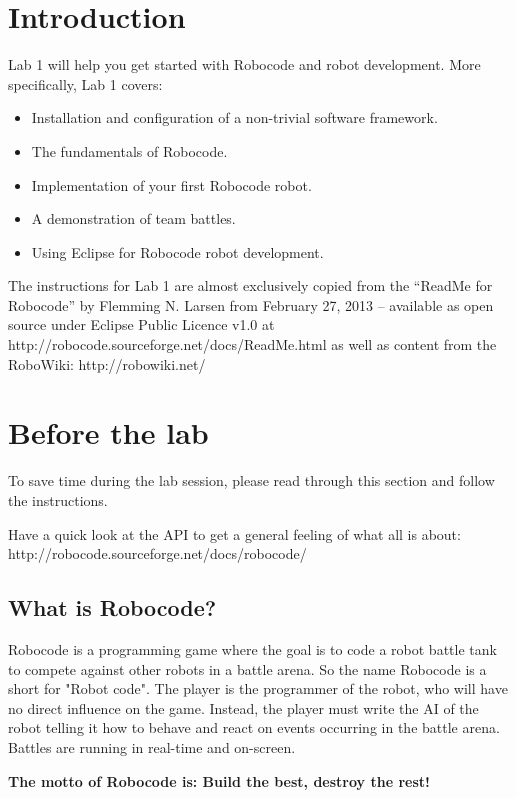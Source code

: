 \documentclass{scrreprt}
\begin{document}
\chapter{Introduction}
Lab 1 will help you get started with Robocode and robot development. More specifically, Lab 1 covers:

\begin{itemize}
\item Installation and configuration of a non-trivial software framework.
\item The fundamentals of Robocode.
\item Implementation of your first Robocode robot.
\item A demonstration of team battles. 
\item Using Eclipse for Robocode robot development.
\end{itemize}

The instructions for Lab 1 are almost exclusively copied from the ``ReadMe for Robocode'' by Flemming N. Larsen from February 27, 2013 -- available as open source under Eclipse Public Licence v1.0 at http://robocode.sourceforge.net/docs/ReadMe.html as well as content from the RoboWiki: http://robowiki.net/

\chapter{Before the lab}
To save time during the lab session, please read through this section and follow the instructions.

Have a quick look at the API to get a general feeling of what all is about:\\ 
http://robocode.sourceforge.net/docs/robocode/

\section{What is Robocode?}
Robocode is a programming game where the goal is to code a robot battle tank to compete against other robots in a battle arena. So the name Robocode is a short for "Robot code". The player is the programmer of the robot, who will have no direct influence on the game. Instead, the player must write the AI of the robot telling it how to behave and react on events occurring in the battle arena. Battles are running in real-time and on-screen.

\begin{center}
\textbf{The motto of Robocode is: Build the best, destroy the rest!}
\end{center}
\end{document}
